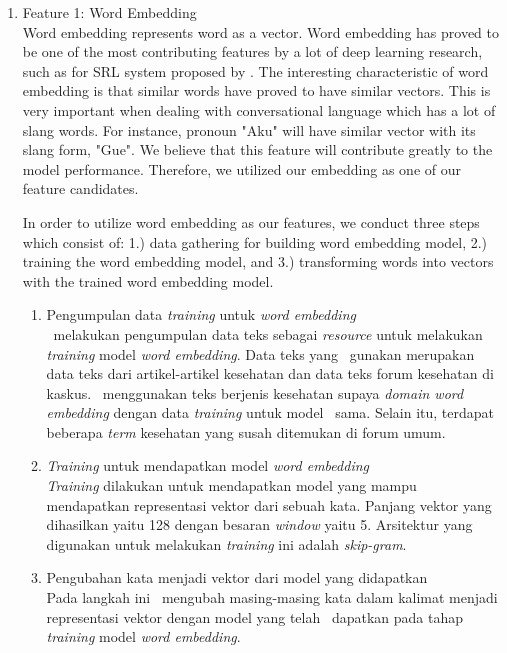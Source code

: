 \begin{enumerate}
	\item Feature 1: Word Embedding\\
	Word embedding represents word as a vector. Word embedding has proved to be one of the most contributing features by a lot of deep learning research, such as for SRL system proposed by \cite{zhou2015end} \cite{collobert2011natural}. The interesting characteristic of word embedding is that similar words have proved to have similar vectors. This is very important when dealing with conversational language which has a lot of slang words. For instance, pronoun "Aku" will have similar vector with its slang form, "Gue". We believe that this feature will contribute greatly to the model performance. Therefore, we utilized our embedding as one of our feature candidates.
	
	In order to utilize word embedding as our features, we conduct three steps which consist of: 1.) data gathering for building word embedding model, 2.) training the word embedding model, and 3.) transforming words into vectors with the trained word embedding model.
	
	\begin{enumerate}
		\item Pengumpulan data \textit{training} untuk \textit{word embedding}\\
		\Saya~melakukan pengumpulan data teks sebagai \textit{resource} untuk melakukan \textit{training} model \textit{word embedding}. Data teks yang \saya~gunakan merupakan data teks dari artikel-artikel kesehatan dan data teks forum kesehatan di kaskus. \Saya~menggunakan teks berjenis kesehatan supaya \textit{domain word embedding} dengan data \textit{training} untuk model \mer~sama. Selain itu, terdapat beberapa \textit{term} kesehatan yang susah ditemukan di forum umum.
		
		\item \textit{Training} untuk mendapatkan model \textit{word embedding}\\
		\textit{Training} dilakukan untuk mendapatkan model yang mampu mendapatkan representasi vektor dari sebuah kata. Panjang vektor yang dihasilkan yaitu 128 dengan besaran \textit{window} yaitu 5. Arsitektur yang digunakan untuk melakukan \textit{training} ini adalah \textit{skip-gram}.
		
		\item Pengubahan kata menjadi vektor dari model yang didapatkan\\
		Pada langkah ini \saya~mengubah masing-masing kata dalam kalimat menjadi representasi vektor dengan model yang telah \saya~dapatkan pada tahap \textit{training} model \textit{word embedding}.
	\end{enumerate}
	

\end{enumerate}

